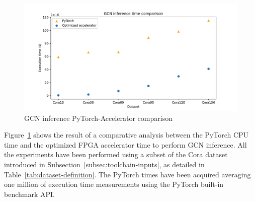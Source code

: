 
\begin{figure}[t!]
    \centering
    \includegraphics[height=0.4\textwidth]{Images/gcn_forward_comparison}
    \caption{GCN inference PyTorch-Accelerator comparison}
    \label{fig:gcn-inference-comparison}
\end{figure}

Figure~\ref{fig:gcn-inference-comparison} shows the result of a comparative analysis between the PyTorch CPU time and the optimized FPGA accelerator time to perform GCN inference.
All the experiments have been performed using a subset of the Cora dataset introduced in Subsection~\ref{subsec:toolchain-inputs}, as detailed in Table~\ref{tab:dataset-definition}.
The PyTorch times have been acquired averaging one million of execution time measurements using the PyTorch built-in benchmark API\@.

